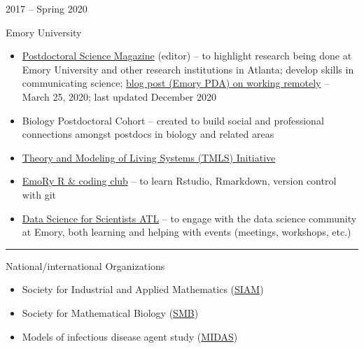 \documentclass[a4paper,10pt]{article}
\newlength{\cvcolumngapwidth}
\newlength{\cvleftcolumnwidth}
\newlength{\cvrightcolumnwidth}
\newcommand{\cvsectionstyle}[1]{{\normalsize\cvsectionfont\textcolor{cvsectioncolor}{#1}}}
\newcommand{\cvtitlestyle}[1]{{\large\cvtitlefont\textcolor{cvtitlecolor}{#1}}}
\newcommand{\cvheadingstyle}[1]{{\normalsize\cvheadingfont\textcolor{cvheadingcolor}{#1}}}
\newlength{\cvafteritemskipamount}
\newlength{\cvaftersectionskipamount}
\newlength{\cvaftertitleskipamount}
\newlength{\cvparskip}
\newcommand{\cvsection}[1]{
            \begin{minipage}[t]{\cvleftcolumnwidth}
                \raggedleft\cvsectionstyle{#1}
            \end{minipage}%
            \hspace{\cvcolumngapwidth}%
            \begin{minipage}[t]{\cvrightcolumnwidth}
                \textcolor{cvrulecolor}{\rule{\cvrightcolumnwidth}{0.3mm}}
            \end{minipage}
        
            \vspace{\cvaftersectionskipamount}
        }
\newcommand{\cvitem}[2]{
            \begin{minipage}[t]{\cvleftcolumnwidth}
                \raggedleft #1
            \end{minipage}%
            \hspace{\cvcolumngapwidth}%
            \begin{minipage}[t]{\cvrightcolumnwidth}
                \setlength{\parskip}{\cvparskip} #2
            \end{minipage}
        
            \vspace{\cvafteritemskipamount}
        }
\newcommand{\cvtitle}[1]{
            \cvtitlestyle{#1}
        
            \vspace{\cvaftertitleskipamount}
            \vspace{-\cvparskip}
        }
\begin{document}
        \cvitem{
            \cvheadingstyle{2017 -- Spring 2020}
        }{
            \cvtitle{Emory University}
            \begin{itemize}[leftmargin=*]
		\item \href{https://emorypda.wordpress.com/postdoc-newsletter/}{Postdoctoral Science Magazine} (editor) --  to highlight research being done at Emory University and other research institutions in Atlanta; develop skills in communicating science; \href{https://emorypda.wordpress.com/2020/03/25/working-remotely-here-are-some-tips-to-stay-safe-and-productive-during-a-pandemic/}{blog post (Emory PDA) on working remotely} -- March 25, 2020; last updated December 2020 
                \item Biology Postdoctoral Cohort -- created to build social and professional connections amongst postdocs in biology and related areas
                \item \href{http://livingtheory.emory.edu/}{Theory and Modeling of Living Systems (TMLS) Initiative}
                \item \href{https://darwinanddavis.github.io/EmoRyCodingClub/index.html}{EmoRy R \& coding club} -- to learn Rstudio, Rmarkdown, version control with git
                \item \href{https://emory.campuslabs.com/engage/organization/data-science-for-scientists-atl}{Data Science for Scientists ATL} -- to engage with the data science community at Emory, both learning and helping with events (meetings, workshops, etc.) 
            \end{itemize}
        }
        
        
        \cvsection{CURRENT PROFESSIONAL MEMBERSHIPS}
        
        \cvitem{
            \cvheadingstyle{}
        }{
            \cvtitle{National/international Organizations}
            \begin{itemize}[leftmargin=*]
                \item Society for Industrial and Applied Mathematics (\href{https://www.siam.org/}{SIAM}) 
            	\item Society for Mathematical Biology (\href{https://www.smb.org/}{SMB})
                \item Models of infectious disease agent study (\href{https://midasnetwork.us/}{MIDAS})
            \end{itemize}
            
        }
        
\end{document}
